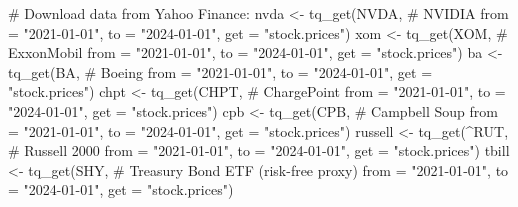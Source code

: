 \documentclass[
  letterpaper,
]{book}
\newenvironment{Shaded}{\begin{snugshade}}{\end{snugshade}}
\newcommand{\AttributeTok}[1]{\textcolor[rgb]{0.40,0.45,0.13}{#1}}
\newcommand{\CommentTok}[1]{\textcolor[rgb]{0.37,0.37,0.37}{#1}}
\newcommand{\FunctionTok}[1]{\textcolor[rgb]{0.28,0.35,0.67}{#1}}
\newcommand{\NormalTok}[1]{\textcolor[rgb]{0.00,0.23,0.31}{#1}}
\newcommand{\OtherTok}[1]{\textcolor[rgb]{0.00,0.23,0.31}{#1}}
\newcommand{\StringTok}[1]{\textcolor[rgb]{0.13,0.47,0.30}{#1}}
\begin{document}
\begin{Shaded}
\begin{Highlighting}[]
\CommentTok{\# Download data from Yahoo Finance:}
\NormalTok{nvda }\OtherTok{\textless{}{-}} \FunctionTok{tq\_get}\NormalTok{(}\StringTok{\textquotesingle{}NVDA\textquotesingle{}}\NormalTok{, }\CommentTok{\# NVIDIA}
               \AttributeTok{from =} \StringTok{"2021{-}01{-}01"}\NormalTok{,}
               \AttributeTok{to =} \StringTok{"2024{-}01{-}01"}\NormalTok{,}
               \AttributeTok{get =} \StringTok{"stock.prices"}\NormalTok{)}
\NormalTok{xom }\OtherTok{\textless{}{-}} \FunctionTok{tq\_get}\NormalTok{(}\StringTok{\textquotesingle{}XOM\textquotesingle{}}\NormalTok{,  }\CommentTok{\# ExxonMobil}
               \AttributeTok{from =} \StringTok{"2021{-}01{-}01"}\NormalTok{,}
               \AttributeTok{to =} \StringTok{"2024{-}01{-}01"}\NormalTok{,}
               \AttributeTok{get =} \StringTok{"stock.prices"}\NormalTok{)}
\NormalTok{ba }\OtherTok{\textless{}{-}} \FunctionTok{tq\_get}\NormalTok{(}\StringTok{\textquotesingle{}BA\textquotesingle{}}\NormalTok{,  }\CommentTok{\# Boeing}
               \AttributeTok{from =} \StringTok{"2021{-}01{-}01"}\NormalTok{,}
               \AttributeTok{to =} \StringTok{"2024{-}01{-}01"}\NormalTok{,}
               \AttributeTok{get =} \StringTok{"stock.prices"}\NormalTok{)}
\NormalTok{chpt }\OtherTok{\textless{}{-}} \FunctionTok{tq\_get}\NormalTok{(}\StringTok{\textquotesingle{}CHPT\textquotesingle{}}\NormalTok{, }\CommentTok{\# ChargePoint}
               \AttributeTok{from =} \StringTok{"2021{-}01{-}01"}\NormalTok{,}
               \AttributeTok{to =} \StringTok{"2024{-}01{-}01"}\NormalTok{,}
               \AttributeTok{get =} \StringTok{"stock.prices"}\NormalTok{)}
\NormalTok{cpb }\OtherTok{\textless{}{-}} \FunctionTok{tq\_get}\NormalTok{(}\StringTok{\textquotesingle{}CPB\textquotesingle{}}\NormalTok{, }\CommentTok{\# Campbell Soup}
               \AttributeTok{from =} \StringTok{"2021{-}01{-}01"}\NormalTok{,}
               \AttributeTok{to =} \StringTok{"2024{-}01{-}01"}\NormalTok{,}
               \AttributeTok{get =} \StringTok{"stock.prices"}\NormalTok{)}
\NormalTok{russell }\OtherTok{\textless{}{-}} \FunctionTok{tq\_get}\NormalTok{(}\StringTok{\textquotesingle{}\^{}RUT\textquotesingle{}}\NormalTok{,  }\CommentTok{\# Russell 2000}
               \AttributeTok{from =} \StringTok{"2021{-}01{-}01"}\NormalTok{,}
               \AttributeTok{to =} \StringTok{"2024{-}01{-}01"}\NormalTok{,}
               \AttributeTok{get =} \StringTok{"stock.prices"}\NormalTok{)}
\NormalTok{tbill }\OtherTok{\textless{}{-}} \FunctionTok{tq\_get}\NormalTok{(}\StringTok{\textquotesingle{}SHY\textquotesingle{}}\NormalTok{, }\CommentTok{\# Treasury Bond ETF (risk{-}free proxy)}
               \AttributeTok{from =} \StringTok{"2021{-}01{-}01"}\NormalTok{,}
               \AttributeTok{to =} \StringTok{"2024{-}01{-}01"}\NormalTok{,}
               \AttributeTok{get =} \StringTok{"stock.prices"}\NormalTok{)}


\end{Highlighting}
\end{Shaded}
\end{document}
